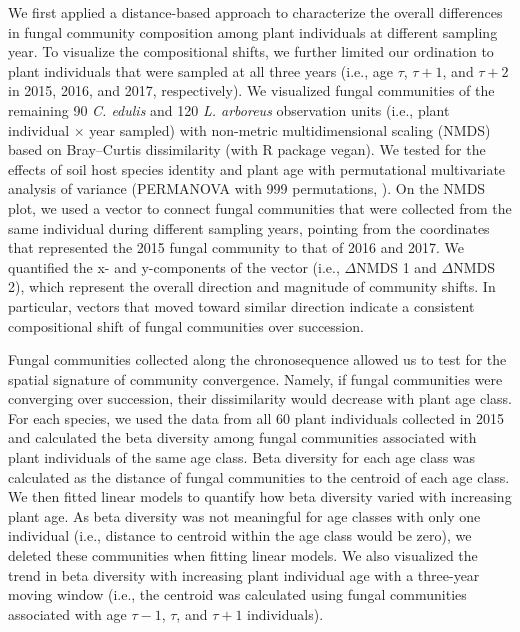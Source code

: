 We first applied a distance-based approach to characterize the overall differences in fungal community composition among plant individuals at different sampling year. 
To visualize the compositional shifts, we further limited our ordination to plant individuals that were sampled at all three years (i.e., age $\tau$, $\tau + 1$, and $\tau + 2$ in 2015, 2016, and 2017, respectively). 
We visualized fungal communities of the remaining 90 \textit{C. edulis} and 120 \textit{L. arboreus} observation units (i.e., plant individual $\times$ year sampled) with non-metric multidimensional scaling (NMDS) based on Bray--Curtis dissimilarity (with R package vegan). We tested for the effects of soil host species identity and plant age with permutational multivariate analysis of variance (PERMANOVA with 999 permutations, \citealp{Anderson2011}). 
On the NMDS plot, we used a vector to connect fungal communities that were collected from the same individual during different sampling years, pointing from the coordinates that represented the 2015 fungal community to that of 2016 and 2017. We quantified the x- and y-components of the vector (i.e., $\Delta$NMDS 1 and $\Delta$NMDS 2), which represent the overall direction and magnitude of community shifts. In particular, vectors that moved toward similar direction indicate a consistent compositional shift of fungal communities over succession.
\par


Fungal communities collected along the chronosequence allowed us to test for the spatial signature of community convergence. Namely, if fungal communities were converging over succession, their dissimilarity would decrease with plant age class. 
For each species, we used the data from all 60 plant individuals collected in 2015 and calculated the beta diversity among fungal communities associated with plant individuals of the same age class. Beta diversity for each age class was calculated as the distance of fungal communities to the centroid of each age class.
We then fitted linear models to quantify how beta diversity varied with increasing plant age.
As beta diversity was not meaningful for age classes with only one individual (i.e., distance to centroid within the age class would be zero), we deleted these communities when fitting linear models. 
We also visualized the trend in beta diversity with increasing plant individual age with a three-year moving window (i.e., the centroid was calculated using fungal communities associated with age $\tau - 1$, $\tau$, and $\tau + 1$ individuals).
\par


